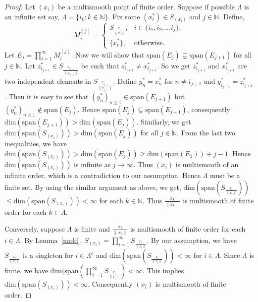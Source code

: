 \documentclass[12pt]{amsart}
\theoremstyle{definition}
\numberwithin{equation}{section}
\begin{document}
\begin{proof} Let $(x_{i})$ be a multismooth point of finite order. Suppose if possible $\Lambda$ is an infinite set say, $\Lambda=\{i_{k}:k\in\mathbb{N}\}$. Fix some $(x^*_i)\in S_{(x_i)}$ and $j\in \mathbb{N}$. Define,
    $$
     M^{(j)}_{i}=
     \begin{cases}
        S_{\frac{x_{i}}{\|x_{i}\|}}, & i\in\{i_{1},i_{2},...i_{j}\},\\
        \{x^*_{i}\}, & \text{otherwise}.
     \end{cases}
     $$
     Let $E_{j}=\prod_{i=1}^{\infty} M^{(j)}_{i}$. Now we will show that $\text{span}(E_{j})\subsetneq \text{span}(E_{j+1})$ for all $j\in \mathbb{N}$. Let $z^*_{i_{j+1}}\in S_{\frac{x_{i_{j+1}}}{\|x_{i_{j+1}}\|}}$ be such that $z^*_{i_{j+1}}\neq x^*_{i_{j+1}}$. So we get $z^*_{i_{j+1}}\text{ and } x^*_{i_{j+1}}$ are two independent elements in $S_{\frac{x_{i_{j+1}}}{\|x_{i_{j+1}}\|}}$. Define $y^*_{n}=x^*_{n} \text{ for } n\neq i_{j+1} \text{ and } y^*_{i_{j+1}}=z^*_{i_{j+1}}$. Then it is easy to see that $(y^*_{n})_{n\geq1}\in \text{span}(E_{j+1})$ but $(y^*_{n})_{n\geq1}\notin \text{span}(E_{j})$. Hence $\text{span}(E_{j})\subsetneq\text{span}(E_{j+1})$, consequently $\text{dim}(\text{span}(E_{j+1}))>\text{dim}(\text{span}(E_{j}))$. Similarly, we get $\text{dim}(\text{span}(S_{(x_{i})}))>\text{dim}(\text{span}(E_{j}))$ for all $j\in \mathbb{N}$. From the last two inequalities, we have $\text{dim}(\text{span}(S_{(x_{i})}))>\text{dim}(\text{span}(E_{j}))\geq \text{dim}(\text{span}(E_{1}))+j-1$. Hence $\text{dim}(\text{span}(S_{(x_{i})}))$ is infinite as $j\to \infty$. Thus $(x_i)$ is multismooth of an infinite order, which is a contradiction to our assumption. Hence $\Lambda$ must be a finite set. By using the similar argument as above, we get, $\text{dim}(\text{span}(S_\frac{x_{k}}{\|x_{k}\|}))$ $\leq \text{dim}(\text{span}(S_{(x_{i})}))<\infty$ for each $k \in \mathbb{N}$. Thus $\frac{x_{k}}{\|x_{k}\|}$ is multismooth of finite order for each $k\in \Lambda$. 

Conversely, suppose $\Lambda$ is finite and $\frac{x_{i}}{\|x_{i}\|}$ is multismooth of finite order for each $i\in \Lambda$. By Lemma~\ref{nadd}, $
S_{(x_{i})} = \prod_{i=1}^{\infty} S_{\frac{x_i}{\|x_{i}\|}}$.
By our assumption, we have $S_{\frac{x_{i}}{\|x_{i}\|}}$ is a singleton for $i\in \Lambda^c$ and $\text{dim}(\text{span}(S_\frac{x_{i}}{\|x_{i}\|}))<\infty$ for $i\in \Lambda$. Since $\Lambda$ is finite, we have $\text{dim}(\text{span}(\prod_{i=1}^{\infty} S_{\frac{x_i}{\|x_{i}\|}})<\infty$. This implies $\text{dim}(\text{span}(S_{(x_{i})}))<\infty$. Consequently $(x_i)$ is multismooth of finite order.


\end{proof}
\end{document}
